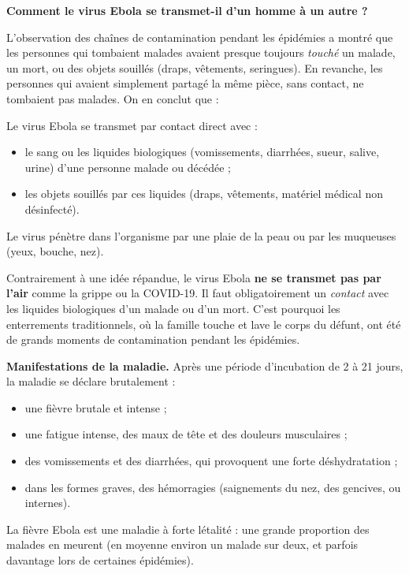 \documentclass[11pt]{article}
\newcommand{\cle}[1]{{\popxbold\color{popdark}#1}}
\begin{document}
\textbf{Comment le virus Ebola se transmet-il d'un homme à un autre ?}

L'observation des chaînes de contamination pendant les épidémies a montré que les personnes qui tombaient malades avaient presque toujours \emph{touché} un malade, un mort, ou des objets souillés (draps, vêtements, seringues). En revanche, les personnes qui avaient simplement partagé la même pièce, sans contact, ne tombaient pas malades. On en conclut que :

\begin{propriete}
Le virus Ebola se transmet par \cle{contact direct} avec :
\begin{itemize}
\item le \cle{sang} ou les \cle{liquides biologiques} (vomissements, diarrhées, sueur, salive, urine) d'une personne malade ou décédée ;
\item les \cle{objets souillés} par ces liquides (draps, vêtements, matériel médical non désinfecté).
\end{itemize}
Le virus pénètre dans l'organisme par une plaie de la peau ou par les muqueuses (yeux, bouche, nez).
\end{propriete}

\begin{attention}
Contrairement à une idée répandue, le virus Ebola \textbf{ne se transmet pas par l'air} comme la grippe ou la COVID-19. Il faut obligatoirement un \emph{contact} avec les liquides biologiques d'un malade ou d'un mort. C'est pourquoi les enterrements traditionnels, où la famille touche et lave le corps du défunt, ont été de grands moments de contamination pendant les épidémies.
\end{attention}

\textbf{Manifestations de la maladie.} Après une période d'incubation de 2 à 21 jours, la maladie se déclare brutalement :
\begin{itemize}
\item une \cle{fièvre brutale} et intense ;
\item une \cle{fatigue intense}, des maux de tête et des douleurs musculaires ;
\item des \cle{vomissements} et des \cle{diarrhées}, qui provoquent une forte déshydratation ;
\item dans les formes graves, des \cle{hémorragies} (saignements du nez, des gencives, ou internes).
\end{itemize}
La fièvre Ebola est une maladie à \cle{forte létalité} : une grande proportion des malades en meurent (en moyenne environ un malade sur deux, et parfois davantage lors de certaines épidémies).
\end{document}
